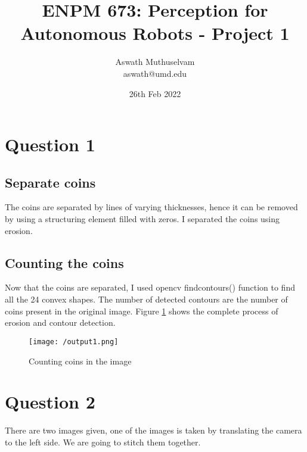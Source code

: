 \documentclass[a4paper, 10pt]{article}
\title{ENPM 673: Perception for Autonomous Robots - Project 1}
\author{Aswath Muthuselvam \\ aswath@umd.edu}
\date{26th Feb 2022}
\begin{document}
	\maketitle
	
	\begin{multicols}{2}
		
		\section{Question 1}
		\subsection{Separate coins}
		
		The coins are separated by lines of varying thicknesses, hence it can be removed by using a structuring element filled with zeros. I separated the coins using erosion.

		\subsection{Counting the coins}
		
		Now that the coins are separated, I used opencv findcontours() function to find all the 24 convex shapes. The number of detected contours are the number of coins present in the original image. Figure \ref{fig:op1} shows the complete process of erosion and contour detection.
				
		\begin{figure}[H]
			\centering
			\texttt{[image: /output1.png]}
			\caption{Counting coins in the image}
			\label{fig:op1}
		\end{figure}

		
		\begin{comment}
		
		\begin{figure*}
		\centering
		\texttt{[image: /Q1/ARDetectionUsingFFt.png]}
		\caption{Projecting the Testudo image on the ARTag}
		\label{fig:ARTa1g}
		\end{figure*}
		
		\end{comment}
		
		
		\section{Question 2}
		There are two images given, one of the images is taken by translating the camera to the left side. We are going to stitch them together. 
		

\end{multicols}
\end{document}
